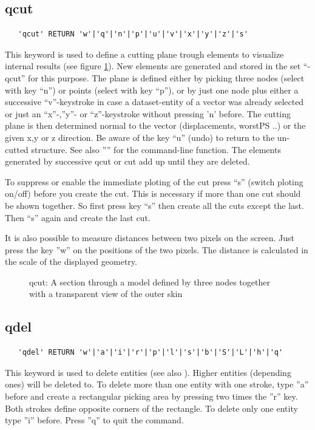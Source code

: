 \documentclass{article}
\begin{document}
\subsection{\label{qcut}qcut}
\begin{verbatim}
   'qcut' RETURN 'w'|'q'|'n'|'p'|'u'|'v'|'x'|'y'|'z'|'s'
\end{verbatim}
This keyword is used to define a cutting plane trough elements to visualize internal results (see figure \ref{qcutp}). New elements are generated and stored in the set ``-qcut'' for this purpose. The plane is defined either by picking three nodes (select with key ``n'') or points (select with key ``p''), or by just one node plus either a successive ``v''-keystroke in case a dataset-entity of a vector was already selected or just an ``x''-,''y''- or ``z''-keystroke without pressing 'n' before. The cutting plane is then determined normal to the vector (displacements, worstPS ..) or the given x,y or z direction. Be aware of the key ``u'' (undo) to return to the un-cutted structure. See also '''' for the command-line function. The elements generated by successive qcut or cut add up until they are deleted.

To suppress or enable the immediate ploting of the cut press ``s'' (switch ploting on/off) before you create the cut. This is necessary if more than one cut should be shown together. So first press key ``s'' then create all the cuts except the last. Then ``s'' again and create the last cut.
 
It is also possible to measure distances between two pixels on the screen. Just press the key ''w'' on the positions of the two pixels. The distance is calculated in the scale of the displayed geometry.
  
\begin{figure}[h]
\caption{\label{qcutp}qcut: A section through a model defined by three nodes together with a transparent view of the outer skin}
\end{figure}

\subsection{\label{qdel}qdel}
\begin{verbatim}
   'qdel' RETURN 'w'|'a'|'i'|'r'|'p'|'l'|'s'|'b'|'S'|'L'|'h'|'q' 
\end{verbatim}
This keyword is used to delete entities (see also ). Higher entities (depending ones) will be deleted to. To delete more than one entity with one stroke, type ''a'' before and create a rectangular picking area by pressing two times the ''r'' key. Both strokes define opposite corners of the rectangle. To delete only one entity type ''i'' before. Press ''q'' to quit the command.
\end{document}

